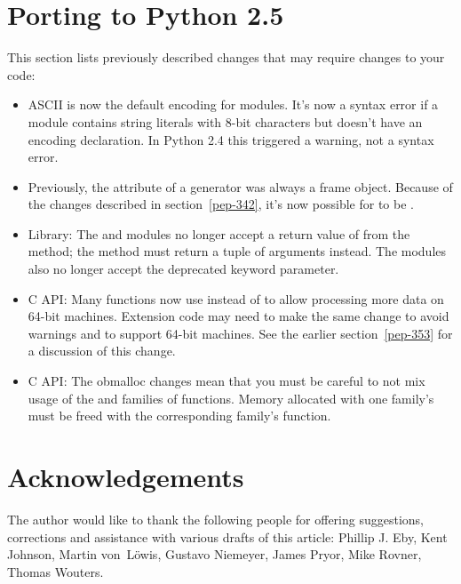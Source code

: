 \documentclass{howto}
\begin{document}
\section{Porting to Python 2.5\label{porting}}

This section lists previously described changes that may require
changes to your code:

\begin{itemize}

\item ASCII is now the default encoding for modules.  It's now 
a syntax error if a module contains string literals with 8-bit
characters but doesn't have an encoding declaration.  In Python 2.4
this triggered a warning, not a syntax error.

\item Previously, the  attribute of a generator
was always a frame object.  Because of the  changes
described in section~\ref{pep-342}, it's now possible
for  to be .


\item Library: The  and  modules no
longer accept a return value of  from the
 method; the method must return a tuple of
arguments instead.  The modules also no longer accept the deprecated
 keyword parameter.

\item C API: Many functions now use  
instead of  to allow processing more data on 64-bit
machines.  Extension code may need to make the same change to avoid
warnings and to support 64-bit machines.  See the earlier
section~\ref{pep-353} for a discussion of this change.

\item C API: 
The obmalloc changes mean that 
you must be careful to not mix usage 
of the  and 
families of functions. Memory allocated with 
one family's  must be 
freed with the corresponding family's  function.

\end{itemize}


\section{Acknowledgements \label{acks}}

The author would like to thank the following people for offering
suggestions, corrections and assistance with various drafts of this
article: Phillip J. Eby, Kent Johnson, Martin von~L\"owis, Gustavo
Niemeyer, James Pryor, Mike Rovner, Thomas Wouters.
\end{document}
